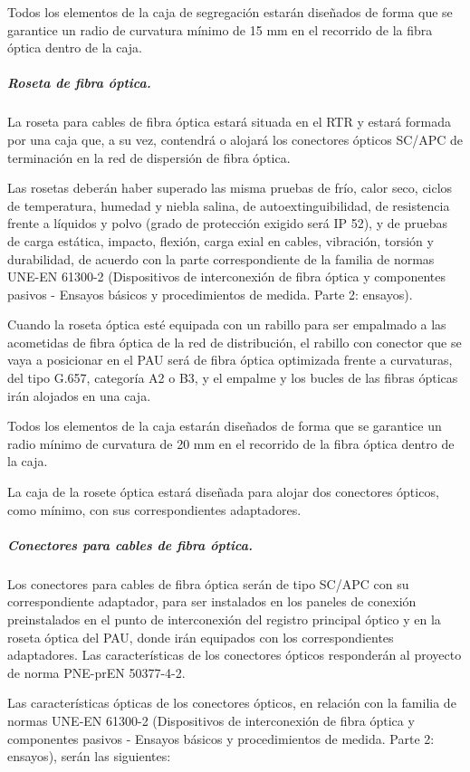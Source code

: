 Todos los elementos de la caja de segregación estarán diseñados de forma que se garantice un radio de curvatura mínimo de 15 mm en el recorrido de la fibra óptica dentro de la caja.

\subparagraph{Roseta de fibra óptica.}
La roseta para cables de fibra óptica estará situada en el RTR y estará formada por una caja que, a su vez, contendrá o alojará los conectores ópticos SC/APC de terminación en la red de dispersión de fibra óptica.

Las rosetas deberán haber superado las misma pruebas de frío, calor seco, ciclos de temperatura, humedad y niebla salina, de autoextinguibilidad, de resistencia frente a líquidos y polvo (grado de protección exigido será IP 52), y de pruebas de carga estática, impacto, flexión, carga exial en cables, vibración, torsión y durabilidad, de acuerdo con la parte correspondiente de la familia de normas UNE-EN 61300-2 (Dispositivos de interconexión de fibra óptica y componentes pasivos - Ensayos básicos y procedimientos de medida. Parte 2: ensayos).

Cuando la roseta óptica esté equipada con un rabillo para ser empalmado a las acometidas de fibra óptica de la red de distribución, el rabillo con conector que se vaya a posicionar en el PAU será de fibra óptica optimizada frente a curvaturas, del tipo G.657, categoría A2 o B3, y el empalme y los bucles de las fibras ópticas irán alojados en una caja.

Todos los elementos de la caja estarán diseñados de forma que se garantice un radio mínimo de curvatura de 20 mm en el recorrido de la fibra óptica dentro de la caja.

La caja de la rosete óptica estará diseñada para alojar dos conectores ópticos, como mínimo, con sus correspondientes adaptadores.

\subparagraph{Conectores para cables de fibra óptica.}
Los conectores para cables de fibra óptica serán de tipo SC/APC con su correspondiente adaptador, para ser instalados en los paneles de conexión preinstalados en el punto de interconexión del registro principal óptico y en la roseta óptica del PAU, donde irán equipados con los correspondientes adaptadores. Las características de los conectores ópticos responderán al proyecto de norma PNE-prEN 50377-4-2.

Las características ópticas de los conectores ópticos, en relación con la familia de normas UNE-EN 61300-2 (Dispositivos de interconexión de fibra óptica y componentes pasivos - Ensayos básicos y procedimientos de medida. Parte 2: ensayos), serán las siguientes:

